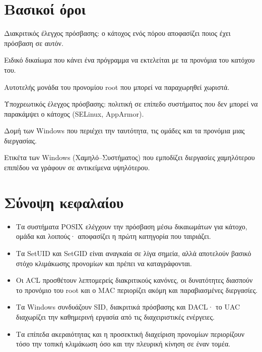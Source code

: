 \documentclass[11pt,openany]{book}
\begin{document}
\section*{Βασικοί όροι}
\begin{description}[style=nextline,leftmargin=1.2em]
  \item[DAC] Διακριτικός έλεγχος πρόσβασης: ο κάτοχος ενός πόρου αποφασίζει ποιος έχει πρόσβαση σε αυτόν.
  \item[SetUID] Ειδικό δικαίωμα που κάνει ένα πρόγραμμα να εκτελείται με τα προνόμια του κατόχου του.
  \item[Δυνατότητα (capability)] Αυτοτελής μονάδα του προνομίου root που μπορεί να παραχωρηθεί χωριστά.
  \item[MAC] Υποχρεωτικός έλεγχος πρόσβασης: πολιτική σε επίπεδο συστήματος που δεν μπορεί να παρακάμψει ο κάτοχος (SELinux, AppArmor).
  \item[Διακριτικό πρόσβασης] Δομή των Windows που περιέχει την ταυτότητα, τις ομάδες και τα προνόμια μιας διεργασίας.
  \item[Επίπεδο ακεραιότητας] Ετικέτα των Windows (Χαμηλό–Συστήματος) που εμποδίζει διεργασίες χαμηλότερου επιπέδου να γράφουν σε αντικείμενα υψηλότερου.
\end{description}

\section*{Σύνοψη κεφαλαίου}
\begin{itemize}
  \item Τα συστήματα POSIX ελέγχουν την πρόσβαση μέσω δικαιωμάτων για κάτοχο, ομάδα και λοιπούς· αποφασίζει η πρώτη κατηγορία που ταιριάζει.
  \item Τα SetUID και SetGID είναι αναγκαία σε λίγα σημεία, αλλά αποτελούν βασικό στόχο κλιμάκωσης προνομίων και πρέπει να καταγράφονται.
  \item Οι ACL προσθέτουν λεπτομερείς διακριτικούς κανόνες, οι δυνατότητες διασπούν το προνόμιο του root και ο MAC περιορίζει ακόμη και παραβιασμένες διεργασίες.
  \item Τα Windows συνδυάζουν SID, διακριτικά πρόσβασης και DACL· το UAC διαχωρίζει την καθημερινή εργασία από τις διαχειριστικές ενέργειες.
  \item Τα επίπεδα ακεραιότητας και η προσεκτική διαχείριση προνομίων περιορίζουν τόσο την τοπική κλιμάκωση όσο και την πλευρική κίνηση σε έναν τομέα.
\end{itemize}
\end{document}
